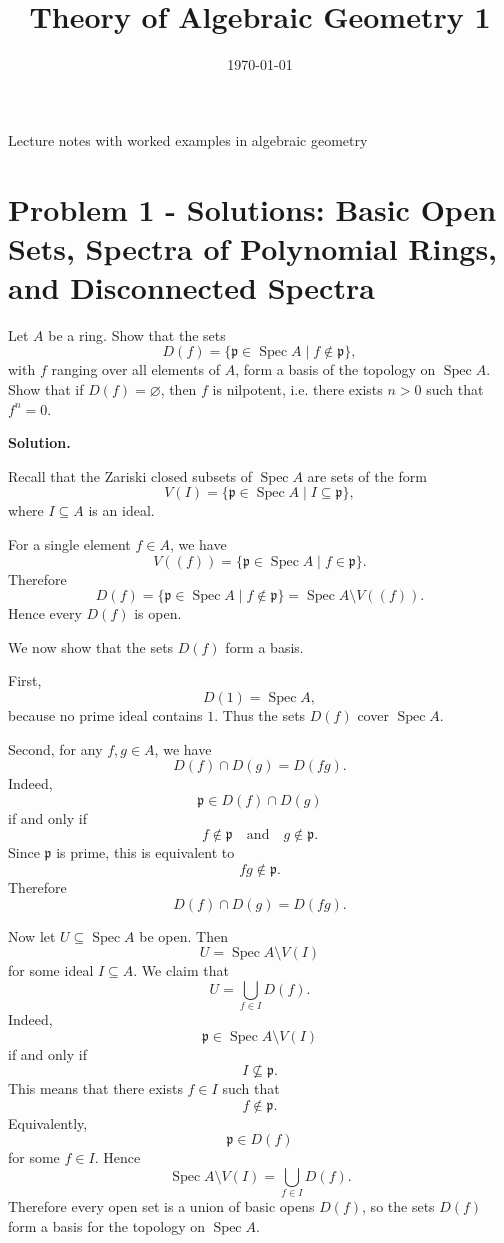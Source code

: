 \documentclass[12pt,a4paper]{article}
\title{\vspace{-1.5em}\bfseries Theory of Algebraic Geometry 1}
\author{}
\date{\today}
\newcommand{\Spec}{\operatorname{Spec}}
\begin{document}
	\maketitle
	\thispagestyle{plain}
		\begin{center}
		\begin{minipage}{0.92\textwidth}
			Lecture notes with worked examples in algebraic geometry
		\end{minipage}
	\end{center}
		\tableofcontents
	\clearpage


	
	\section*{Problem 1 - Solutions: Basic Open Sets, Spectra of Polynomial Rings, and Disconnected Spectra}
	
	Let \(A\) be a ring. Show that the sets
	\[
	D(f)=\{\mathfrak p\in \Spec A \mid f\notin \mathfrak p\},
	\]
	with \(f\) ranging over all elements of \(A\), form a basis of the topology on
	\(\Spec A\). Show that if \(D(f)=\varnothing\), then \(f\) is nilpotent, i.e. there
	exists \(n>0\) such that \(f^n=0\).
	
	\bigskip
	
	\textbf{Solution.}
	
	Recall that the Zariski closed subsets of \(\Spec A\) are sets of the form
	\[
	V(I)=\{\mathfrak p\in \Spec A \mid I\subseteq \mathfrak p\},
	\]
	where \(I\subseteq A\) is an ideal.
	
	For a single element \(f\in A\), we have
	\[
	V((f))=\{\mathfrak p\in \Spec A \mid f\in \mathfrak p\}.
	\]
	Therefore
	\[
	D(f)=\{\mathfrak p\in \Spec A \mid f\notin \mathfrak p\}
	=\Spec A\setminus V((f)).
	\]
	Hence every \(D(f)\) is open.
	
	We now show that the sets \(D(f)\) form a basis.
	
	First,
	\[
	D(1)=\Spec A,
	\]
	because no prime ideal contains \(1\). Thus the sets \(D(f)\) cover \(\Spec A\).
	
	Second, for any \(f,g\in A\), we have
	\[
	D(f)\cap D(g)=D(fg).
	\]
	Indeed,
	\[
	\mathfrak p\in D(f)\cap D(g)
	\]
	if and only if
	\[
	f\notin \mathfrak p
	\quad\text{and}\quad
	g\notin \mathfrak p.
	\]
	Since \(\mathfrak p\) is prime, this is equivalent to
	\[
	fg\notin \mathfrak p.
	\]
	Therefore
	\[
	D(f)\cap D(g)=D(fg).
	\]
	
	Now let \(U\subseteq \Spec A\) be open. Then
	\[
	U=\Spec A\setminus V(I)
	\]
	for some ideal \(I\subseteq A\). We claim that
	\[
	U=\bigcup_{f\in I}D(f).
	\]
	Indeed,
	\[
	\mathfrak p\in \Spec A\setminus V(I)
	\]
	if and only if
	\[
	I\not\subseteq \mathfrak p.
	\]
	This means that there exists \(f\in I\) such that
	\[
	f\notin \mathfrak p.
	\]
	Equivalently,
	\[
	\mathfrak p\in D(f)
	\]
	for some \(f\in I\). Hence
	\[
	\Spec A\setminus V(I)=\bigcup_{f\in I}D(f).
	\]
	Therefore every open set is a union of basic opens \(D(f)\), so the sets \(D(f)\)
	form a basis for the topology on \(\Spec A\).
	
\end{document}
